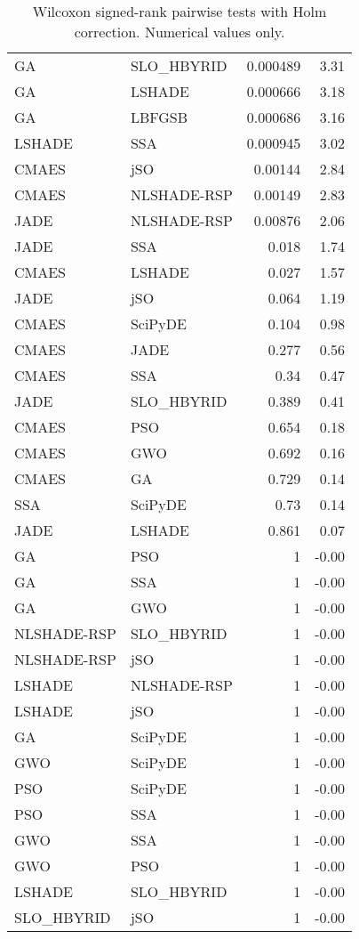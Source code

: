 \begin{table}[t]
\begin{tabular}{l l r r}
GA & SLO_HBYRID & 0.000489 & 3.31\\
GA & LSHADE & 0.000666 & 3.18\\
GA & LBFGSB & 0.000686 & 3.16\\
LSHADE & SSA & 0.000945 & 3.02\\
CMAES & jSO & 0.00144 & 2.84\\
CMAES & NLSHADE-RSP & 0.00149 & 2.83\\
JADE & NLSHADE-RSP & 0.00876 & 2.06\\
JADE & SSA & 0.018 & 1.74\\
CMAES & LSHADE & 0.027 & 1.57\\
JADE & jSO & 0.064 & 1.19\\
CMAES & SciPyDE & 0.104 & 0.98\\
CMAES & JADE & 0.277 & 0.56\\
CMAES & SSA & 0.34 & 0.47\\
JADE & SLO_HBYRID & 0.389 & 0.41\\
CMAES & PSO & 0.654 & 0.18\\
CMAES & GWO & 0.692 & 0.16\\
CMAES & GA & 0.729 & 0.14\\
SSA & SciPyDE & 0.73 & 0.14\\
JADE & LSHADE & 0.861 & 0.07\\
GA & PSO & 1 & -0.00\\
GA & SSA & 1 & -0.00\\
GA & GWO & 1 & -0.00\\
NLSHADE-RSP & SLO_HBYRID & 1 & -0.00\\
NLSHADE-RSP & jSO & 1 & -0.00\\
LSHADE & NLSHADE-RSP & 1 & -0.00\\
LSHADE & jSO & 1 & -0.00\\
GA & SciPyDE & 1 & -0.00\\
GWO & SciPyDE & 1 & -0.00\\
PSO & SciPyDE & 1 & -0.00\\
PSO & SSA & 1 & -0.00\\
GWO & SSA & 1 & -0.00\\
GWO & PSO & 1 & -0.00\\
LSHADE & SLO_HBYRID & 1 & -0.00\\
SLO_HBYRID & jSO & 1 & -0.00\\
\bottomrule\end{tabular}
\caption{Wilcoxon signed-rank pairwise tests with Holm correction. Numerical values only.}
\label{tab:wilcoxon-holm-numeric}
\end{table}

